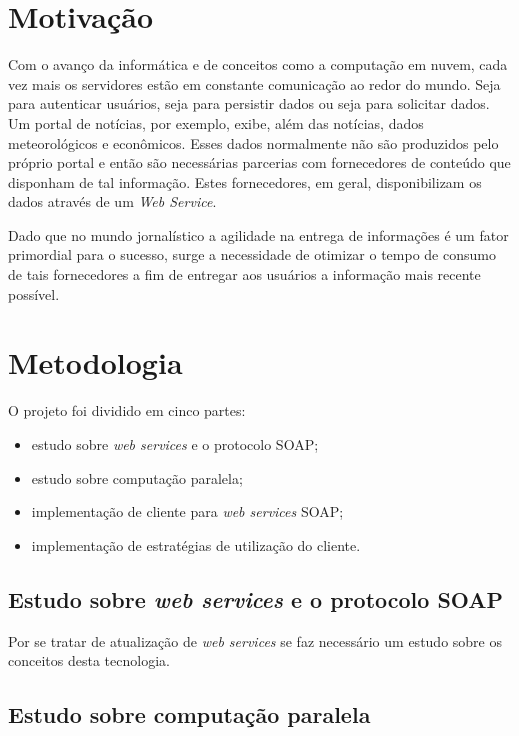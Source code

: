 \section{Motivação}

Com o avanço da informática e de conceitos como a computação em nuvem, cada vez mais os servidores estão em constante comunicação ao redor do mundo. Seja para autenticar usuários, seja para persistir dados ou seja para solicitar dados. Um portal de notícias, por exemplo, exibe, além das notícias, dados meteorológicos e econômicos. Esses dados normalmente não são produzidos pelo próprio portal e então são necessárias parcerias com fornecedores de conteúdo que disponham de tal informação. Estes fornecedores, em geral, disponibilizam os dados através de um \textit{Web Service}.

Dado que no mundo jornalístico a agilidade na entrega de informações é um fator primordial para o sucesso, surge a necessidade de otimizar o tempo de consumo de tais fornecedores a fim de entregar aos usuários a informação mais recente possível.

\section{Metodologia}

O projeto foi dividido em cinco partes: 

\begin{itemize}
\item estudo sobre \textit{web services} e o protocolo SOAP;
\item estudo sobre computação paralela;
\item implementação de cliente para \textit{web services} SOAP;
\item implementação de estratégias de utilização do cliente.
\end{itemize}


\subsection{Estudo sobre \textit{web services} e o protocolo SOAP}

Por se tratar de atualização de \textit{web services} se faz necessário um estudo sobre os conceitos desta tecnologia.

\subsection{Estudo sobre computação paralela}

